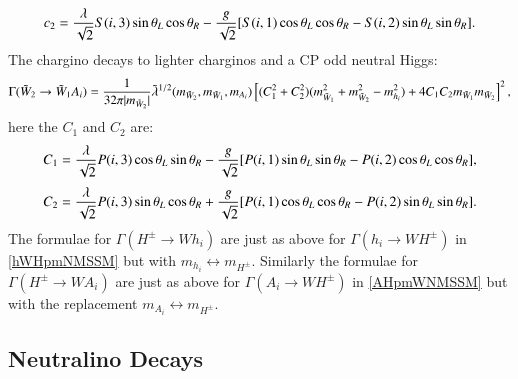 \documentclass[final,3p,times,pdflatex]{elsarticle}
\begin{document}
\begin{equation}
c_{2} = {\lambda \over \sqrt{2}}S(i,3)\sin\theta_L \cos\theta_R - {g \over \sqrt{2}}[S(i,1)\cos\theta_L \cos\theta_R - S(i,2) \sin\theta_L \sin\theta_R].
\end{equation}
The chargino decays to lighter charginos and a CP odd neutral Higgs:
\begin{equation} \label{ch2ch1ANMSSM}
\Gamma(\tilde{W}_2 \rightarrow \tilde{W}_1 A_{i}) = {1 \over 32 \pi |m_{\tilde{W}_2}|} \tilde{\lambda}^{1/2}(m_{\tilde{W}_2},m_{\tilde{W}_1},m_{A_i})\left[(C_{1}^2 + C_{2}^2)(m_{\tilde{W}_1}^2 + m_{\tilde{W}_2}^2 - m_{h_i}^2) + 4C_{1} C_{2} m_{\tilde{W}_1} m_{\tilde{W}_2}\right]^2,
\end{equation}
here the $C_{1}$ and $C_{2}$ are:
\begin{equation}
C_{1} = {\lambda \over \sqrt{2}}P(i,3)\cos\theta_L \sin\theta_R - {g \over \sqrt{2}}[P(i,1)\sin\theta_L \sin\theta_R - P(i,2) \cos\theta_L \cos\theta_R],
\end{equation}
\begin{equation}
C_{2} = {\lambda \over \sqrt{2}}P(i,3)\sin\theta_L \cos\theta_R + {g \over \sqrt{2}}[P(i,1)\cos\theta_L \cos\theta_R -P(i,2) \sin\theta_L \sin\theta_R].
\end{equation}
The formulae for $\Gamma(H^{\pm} \rightarrow W h_{i})$ are just as above for $\Gamma(h_i \rightarrow W H^{\pm})$ in  \eqref{hWHpmNMSSM} but with $m_{h_i} \leftrightarrow m_{H^{\pm}}$. Similarly the  formulae for $\Gamma(H^{\pm} \rightarrow W A_{i})$ are just as above for $\Gamma(A_i \rightarrow W H^{\pm})$ in \eqref{AHpmWNMSSM} but with the replacement $m_{A_i} \leftrightarrow m_{H^{\pm}}$.

\subsection{Neutralino Decays}
\end{document}
